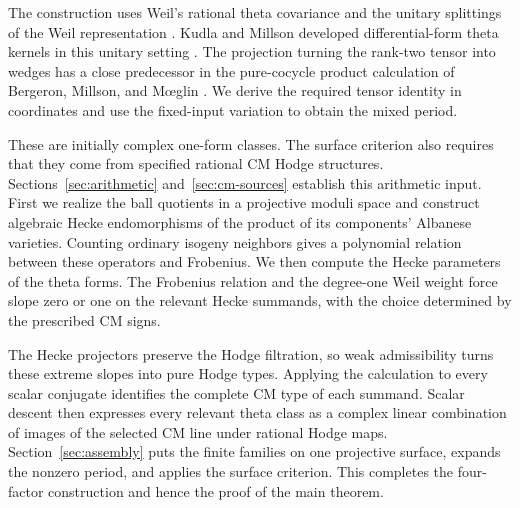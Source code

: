 The construction uses Weil's rational theta covariance and the unitary
splittings of the Weil representation
\cite{Weil1964,Kudla1994,BoradeEtAl2025ToriPeriods}.
Kudla and Millson developed differential-form theta kernels in this
unitary setting \cite[Introduction and Theorem~3]{KudlaMillson1990DifferentialTheta}.
The projection turning the rank-two tensor into wedges has a close
predecessor in the pure-cocycle product calculation of Bergeron,
Millson, and M\oe glin \cite[Lemmas~5.7 and~5.11]{BMM2016}.
We derive the required tensor identity in coordinates and use the
fixed-input variation to obtain the mixed period.

These are initially complex one-form classes.  The surface criterion
also requires that they come from specified rational CM Hodge
structures.  Sections~\ref{sec:arithmetic} and~\ref{sec:cm-sources}
establish this arithmetic input.  First we realize the ball quotients
in a projective moduli space and construct algebraic Hecke
endomorphisms of the product of its components' Albanese varieties.
Counting ordinary isogeny
neighbors gives a polynomial relation between these operators and
Frobenius.  We then compute the Hecke parameters of the theta forms.
The Frobenius relation and the degree-one Weil weight force slope
zero or one on the relevant Hecke summands, with the choice determined
by the prescribed CM signs.

The Hecke projectors preserve the Hodge filtration, so weak
admissibility turns these extreme slopes into pure Hodge types.
Applying the calculation
to every scalar conjugate identifies the complete CM type of each
summand.  Scalar descent then expresses every relevant theta class
as a complex linear combination of images of the selected CM line
under rational Hodge maps.  Section~\ref{sec:assembly} puts the
finite families on one projective surface, expands the nonzero
period, and applies the surface criterion.  This completes the
four-factor construction and hence the proof of the main theorem.
